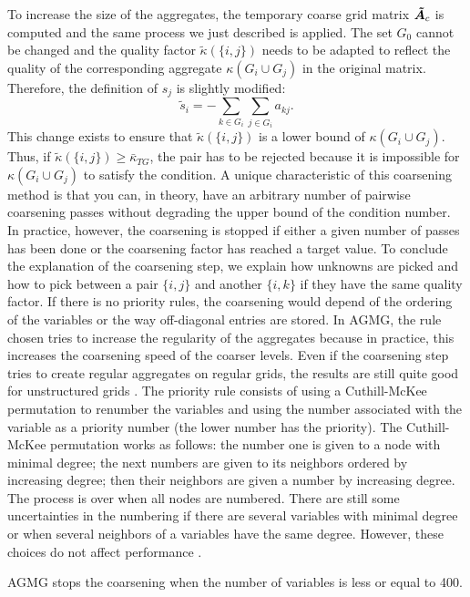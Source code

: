 To increase the size of the aggregates, the temporary coarse grid matrix
$\boldsymbol{\tilde{A}}_c$ is computed and the same process we just
described is applied. The set $G_0$ cannot be changed and the quality factor
$\tilde{\kappa}(\{i,j\})$ needs to be adapted to reflect the quality of the
corresponding aggregate $\kappa(G_i\cup G_j)$ in the original matrix.
Therefore, the definition of $s_j$ is slightly modified:
\begin{equation}
  \tilde{s}_i = - \sum_{k \in G_i} \sum_{j \in G_i} a_{kj}.
\end{equation}
This change exists to ensure that $\tilde{\kappa}(\{i,j\})$ is a lower
bound of $\kappa(G_i \cup G_j)$. Thus, if $\tilde{\kappa}(\{i,j\}) \geq
\bar{\kappa}_{TG}$, the pair has to be rejected because it is impossible for
$\kappa(G_i \cup G_j)$ to satisfy the condition. A unique characteristic 
of this coarsening method is that you can, in theory, have an 
arbitrary number of pairwise coarsening passes without degrading the upper
bound of the condition number. In practice, however, the coarsening is
stopped if either a given number of passes has been done or the coarsening
factor has reached a target value. To conclude the explanation of the
coarsening step, we explain how unknowns are picked and how to pick between 
a pair $\{i,j\}$ and another $\{i,k\}$ if they have the same quality factor. 
If there is no priority rules, the coarsening would depend of the ordering 
of the variables or the way off-diagonal entries are stored. In AGMG, the 
rule chosen tries to increase the regularity of the aggregates because in 
practice, this increases the coarsening speed of the coarser levels. Even 
if the coarsening step tries to create regular aggregates on regular grids, 
the results are still quite good for unstructured grids \cite{agmg2}. The 
priority rule consists of using a Cuthill-McKee permutation \cite{cmk} to 
renumber the variables and using the number associated with the 
variable as a priority number (the lower number has the priority). The 
Cuthill-McKee permutation works as follows: the number one is given to a node 
with minimal degree; the next numbers are given to its neighbors ordered by
increasing degree; then their neighbors are given a number by
increasing degree. The process is over when all nodes are numbered. There are
still some uncertainties in the numbering if there are several variables
with minimal degree or when several neighbors of a variables have the same
degree. However, these choices do not affect performance \cite{agmg2}. 

AGMG stops the coarsening when the number of variables is less or equal to
400.
